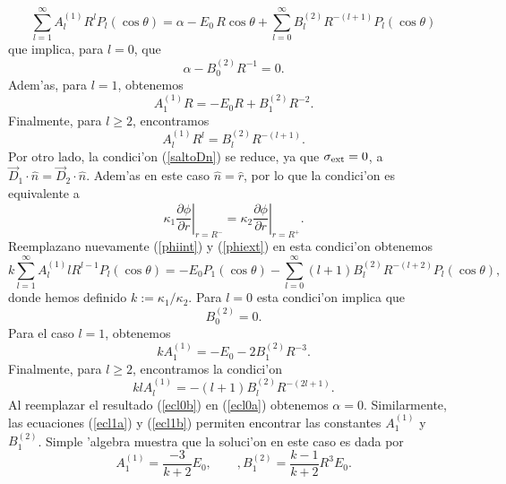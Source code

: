  \begin{equation}
 \sum_{l=1}^{\infty}A_l^{(1)}R^{l}P_l(\cos\theta)  
 =\alpha-E_0\,R\cos\theta+\sum_{l=0}^{\infty}B_l^{(2)}R^{-(l+1)} P_l(\cos\theta)
 \end{equation}
 que implica, para $l=0$, que
\begin{equation}\label{ecl0a}
\alpha-B_0^{(2)}R^{-1}=0.
\end{equation}
Adem'as, para $l=1$, obtenemos
\begin{equation}\label{ecl1a}
 A_1^{(1)}R =-E_0R+B_1^{(2)}R^{-2}.
\end{equation}
Finalmente, para $l\geq2$, encontramos
\begin{equation}\label{eclla}
 A_l^{(1)}R^{l} =B_l^{(2)}R^{-(l+1)}.
\end{equation}
Por otro lado, la condici'on (\ref{saltoDn}) se reduce, ya que $\sigma_{\rm ext}=0$, a $\vec{D}_1\cdot\hat{n}=\vec{D}_2\cdot\hat{n}$. Adem'as en este caso $\hat{n}=\hat{r}$, por lo que la condici'on es equivalente a
\begin{equation}
\kappa_1\left.\frac{\partial\phi}{\partial r}\right|_{r=R^-}
=\kappa_2\left.\frac{\partial\phi}{\partial r}\right|_{r=R^+}.
\end{equation}
Reemplazano nuevamente (\ref{phiint}) y (\ref{phiext}) en esta condici'on obtenemos
\begin{equation}\label{condD}
 k\sum_{l=1}^{\infty}A_l^{(1)}lR^{l-1}P_l(\cos\theta) =-E_0P_1(\cos\theta)  -\sum_{l=0}^{\infty}(l+1)B_l^{(2)}R^{-(l+2)}P_l(\cos\theta),
\end{equation}
donde hemos definido $k:=\kappa_1/\kappa_2$. Para $l=0$ esta condici'on implica que
\begin{equation}\label{ecl0b}
B_0^{(2)}=0.
\end{equation}
Para el caso $l=1$, obtenemos
\begin{equation}\label{ecl1b}
kA_1^{(1)}  =-E_0-2B_1^{(2)}R^{-3}.
\end{equation}
Finalmente, para $l\geq2$, encontramos la condici'on
\begin{equation}\label{ecllb}
klA_l^{(1)} =-(l+1)B_l^{(2)}R^{-(2l+1)}.
\end{equation}
Al reemplazar el resultado (\ref{ecl0b}) en (\ref{ecl0a}) obtenemos $\alpha=0$. Similarmente, las ecuaciones (\ref{ecl1a}) y (\ref{ecl1b}) permiten encontrar las constantes $A_1^{(1)}$ y $B_1^{(2)}$. Simple 'algebra muestra que la soluci'on en este caso es dada por
\begin{equation}
 A_1^{(1)}=\frac{-3}{k+2}E_0, \qquad, B_1^{(2)}=\frac{k-1}{k+2}R^3E_0.
 \end{equation}
